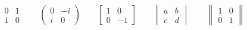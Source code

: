 \documentclass[letterpaper,12pt]{article}
\begin{document}
\pagestyle{empty}
\thispagestyle{empty}

\noindent

\begin{gather*}
 \begin{matrix} 0 & 1 \\ 1 & 0 \end{matrix} \qquad
 \begin{pmatrix} 0 &-i \\ i & 0 \end{pmatrix} \qquad
 \begin{bmatrix} 1 & 0 \\ 0 &-1 \end{bmatrix} \qquad
 \begin{vmatrix} a & b \\ c & d \end{vmatrix} \qquad 
 \begin{Vmatrix}1 & 0 \\ 0 & 1 \end{Vmatrix} 
\end{gather*}
\end{document}
